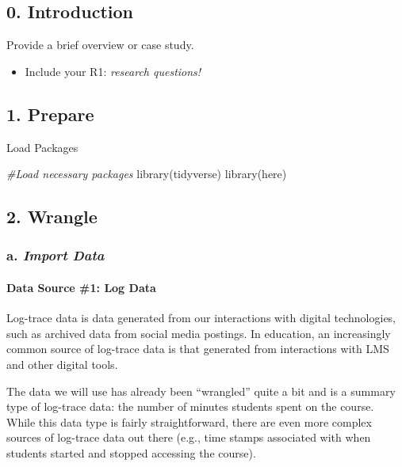 \documentclass[
]{article}
\author{Jeanne McClure}
\date{2022-07-08}
\newenvironment{Shaded}{\begin{snugshade}}{\end{snugshade}}
\newcommand{\CommentTok}[1]{\textcolor[rgb]{0.56,0.35,0.01}{\textit{#1}}}
\newcommand{\FunctionTok}[1]{\textcolor[rgb]{0.00,0.00,0.00}{#1}}
\newcommand{\NormalTok}[1]{#1}
\providecommand{\tightlist}{%
  \setlength{\itemsep}{0pt}\setlength{\parskip}{0pt}}
\begin{document}
\hypertarget{introduction}{%
\subsection{0. Introduction}\label{introduction}}

Provide a brief overview or case study.

\begin{itemize}
\tightlist
\item
  Include your R1: \emph{research questions!}
\end{itemize}

\hypertarget{prepare}{%
\subsection{1. Prepare}\label{prepare}}

Load Packages

\begin{Shaded}
\begin{Highlighting}[]
\CommentTok{\#Load necessary packages}
\FunctionTok{library}\NormalTok{(tidyverse)}
\FunctionTok{library}\NormalTok{(here)}
\end{Highlighting}
\end{Shaded}

\hypertarget{wrangle}{%
\subsection{2. Wrangle}\label{wrangle}}

\hypertarget{a.-import-data}{%
\subsubsection{\texorpdfstring{a. \emph{Import
Data}}{a. Import Data}}\label{a.-import-data}}

\hypertarget{data-source-1-log-data}{%
\paragraph{Data Source \#1: Log Data}\label{data-source-1-log-data}}

Log-trace data is data generated from our interactions with digital
technologies, such as archived data from social media postings. In
education, an increasingly common source of log-trace data is that
generated from interactions with LMS and other digital tools.

The data we will use has already been ``wrangled'' quite a bit and is a
summary type of log-trace data: the number of minutes students spent on
the course. While this data type is fairly straightforward, there are
even more complex sources of log-trace data out there (e.g., time stamps
associated with when students started and stopped accessing the course).
\end{document}
